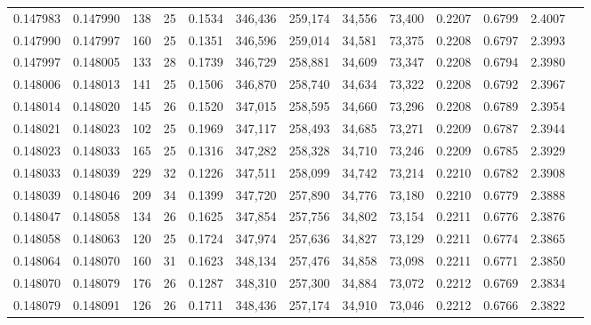 \begin{tabular}{rrrrrrrrrrrrr}
0.147983 & 0.147990 & 138 &  25 &                                     0.1534 & 346,436 & 259,174 &  34,556 &  73,400 & 0.2207 & 0.6799 & 2.4007 \\
0.147990 & 0.147997 & 160 &  25 &                                     0.1351 & 346,596 & 259,014 &  34,581 &  73,375 & 0.2208 & 0.6797 & 2.3993 \\
0.147997 & 0.148005 & 133 &  28 &                                     0.1739 & 346,729 & 258,881 &  34,609 &  73,347 & 0.2208 & 0.6794 & 2.3980 \\
0.148006 & 0.148013 & 141 &  25 &                                     0.1506 & 346,870 & 258,740 &  34,634 &  73,322 & 0.2208 & 0.6792 & 2.3967 \\
0.148014 & 0.148020 & 145 &  26 &                                     0.1520 & 347,015 & 258,595 &  34,660 &  73,296 & 0.2208 & 0.6789 & 2.3954 \\
0.148021 & 0.148023 & 102 &  25 &                                     0.1969 & 347,117 & 258,493 &  34,685 &  73,271 & 0.2209 & 0.6787 & 2.3944 \\
0.148023 & 0.148033 & 165 &  25 &                                     0.1316 & 347,282 & 258,328 &  34,710 &  73,246 & 0.2209 & 0.6785 & 2.3929 \\
0.148033 & 0.148039 & 229 &  32 &                                     0.1226 & 347,511 & 258,099 &  34,742 &  73,214 & 0.2210 & 0.6782 & 2.3908 \\
0.148039 & 0.148046 & 209 &  34 &                                     0.1399 & 347,720 & 257,890 &  34,776 &  73,180 & 0.2210 & 0.6779 & 2.3888 \\
0.148047 & 0.148058 & 134 &  26 &                                     0.1625 & 347,854 & 257,756 &  34,802 &  73,154 & 0.2211 & 0.6776 & 2.3876 \\
0.148058 & 0.148063 & 120 &  25 &                                     0.1724 & 347,974 & 257,636 &  34,827 &  73,129 & 0.2211 & 0.6774 & 2.3865 \\
0.148064 & 0.148070 & 160 &  31 &                                     0.1623 & 348,134 & 257,476 &  34,858 &  73,098 & 0.2211 & 0.6771 & 2.3850 \\
0.148070 & 0.148079 & 176 &  26 &                                     0.1287 & 348,310 & 257,300 &  34,884 &  73,072 & 0.2212 & 0.6769 & 2.3834 \\
0.148079 & 0.148091 & 126 &  26 &                                     0.1711 & 348,436 & 257,174 &  34,910 &  73,046 & 0.2212 & 0.6766 & 2.3822 \\

\end{tabular}
